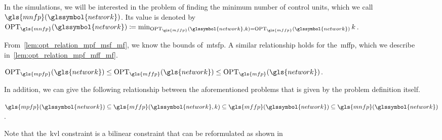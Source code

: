 In the simulations, we will be interested in the problem of finding the minimum
number of control units, which we call~$\gls{mnfp}(\glssymbol{network})$. Its
value is denoted by~$
\opt_{\gls{mnfp}}(\glssymbol{network}) 
\coloneqq
\min_{\opt_{\gls{mffp}}(\glssymbol{network},k) 
= 
\opt_{\gls{mffp}}(\glssymbol{network})} k
% 
$.
%
\begingroup
    
    \label{ch:facts:problems:minimum-number-of-facts}
\endgroup
% 
From~\cref{lem:opt_relation_mpf_msf_mf}, we know the bounds of~\gls{mtsfp}. A
similar relationship holds for the~\gls{mffp}, which we describe
in~\cref{lem:opt_relation_mpf_mff_mf}.
% 
\begin{lemma}
    $\opt_{\gls{mpfp}}(\gls{network})
    \leq
    \opt_{\gls{mffp}}(\gls{network})
    \leq
    \opt_{\gls{mfp}}(\gls{network})$.
    \label{lem:opt_relation_mpf_mff_mf}
\end{lemma}
% 
In addition, we can give the following relationship between the aforementioned
problems that is given by the problem definition itself.
%
\begin{lemma}
  $\gls{mpfp}(\glssymbol{network})\subseteq
  \gls{mffp}(\glssymbol{network},k)\subseteq
  \gls{mffp}(\glssymbol{network})\subseteq
  \gls{mnfp}(\glssymbol{network})$.
  \label{lem:problem_relation_mff_mnf}
\end{lemma}
% 
Note that the~\gls{kvl} constraint is a bilinear constraint that can be
reformulated as shown
in~
% 
